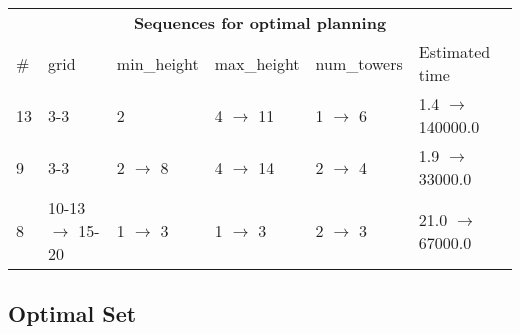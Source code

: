 \documentclass{article}
\begin{document}
                            \begin{center}
                            \begin{tabular}{@{}l|l|l|l|l|l@{}}
                            \multicolumn{6}{c}{\bf \large Sequences for optimal planning}\\
                            \# & grid & min\_height & max\_height & num\_towers & Estimated time\\\midrule
                            13&3-3&2&4 $\rightarrow$ 11&1 $\rightarrow$ 6&1.4 $\rightarrow$ 140000.0\\
9&3-3&2 $\rightarrow$ 8&4 $\rightarrow$ 14&2 $\rightarrow$ 4&1.9 $\rightarrow$ 33000.0\\
8&10-13 $\rightarrow$ 15-20&1 $\rightarrow$ 3&1 $\rightarrow$ 3&2 $\rightarrow$ 3&21.0 $\rightarrow$ 67000.0
                            \end{tabular}
                            \end{center}
                    
                                \subsection*{Optimal Set}
                                
\end{document}
